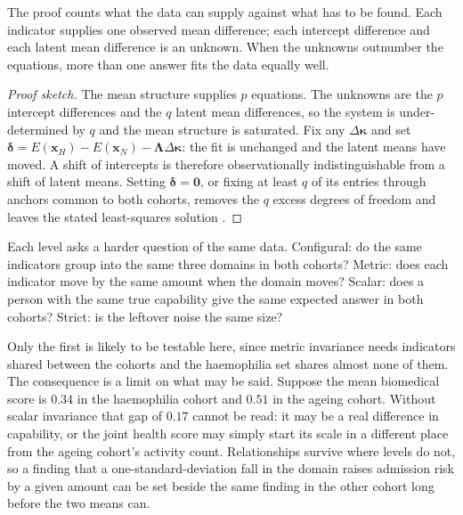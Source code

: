 The proof counts what the data can supply against what has to be found. Each
indicator supplies one observed mean difference; each intercept difference and
each latent mean difference is an unknown. When the unknowns outnumber the
equations, more than one answer fits the data equally well.

\begin{proof}[Proof sketch]
The mean structure supplies $p$ equations. The unknowns are the $p$ intercept
differences and the $q$ latent mean differences, so the system is
under-determined by $q$ and the mean structure is saturated. Fix any
$\Delta\boldsymbol\kappa$ and set $\boldsymbol\delta=E(\mathbf x_H)-
E(\mathbf x_N)-\boldsymbol\Lambda\Delta\boldsymbol\kappa$: the fit is unchanged
and the latent means have moved. A shift of intercepts is therefore
observationally indistinguishable from a shift of latent means. Setting
$\boldsymbol\delta=\mathbf 0$, or fixing at least $q$ of its entries through
anchors common to both cohorts, removes the $q$ excess degrees of freedom and
leaves the stated least-squares solution \citep{meredith_1993}.
\end{proof}

\begin{reading}
Each level asks a harder question of the same data. Configural: do the same
indicators group into the same three domains in both cohorts? Metric: does each
indicator move by the same amount when the domain moves? Scalar: does a person
with the same true capability give the same expected answer in both cohorts?
Strict: is the leftover noise the same size?

Only the first is likely to be testable here, since metric invariance needs
indicators shared between the cohorts and the haemophilia set shares almost
none of them. The consequence is a limit on what may be said. Suppose the mean
biomedical score is $0.34$ in the haemophilia cohort and $0.51$ in the ageing
cohort. Without scalar invariance that gap of $0.17$ cannot be read: it may be
a real difference in capability, or the joint health score may simply start its
scale in a different place from the ageing cohort's activity count. Relationships survive where
levels do not, so a finding that a one-standard-deviation fall in the domain
raises admission risk by a given amount can be set beside the same finding in
the other cohort long before the two means can.
\end{reading}

